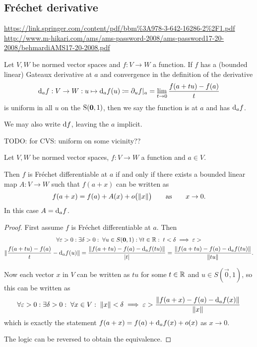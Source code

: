\subsection{Fréchet derivative}
\url{https://link.springer.com/content/pdf/bbm%3A978-3-642-16286-2%2F1.pdf}
\url{http://www.m-hikari.com/ams/ams-password-2008/ams-password17-20-2008/behmardiAMS17-20-2008.pdf}

\begin{definition}
Let $V,W$ be normed vector spaces and $f: V\to W$ a function.
If $f$ has a (bounded linear) Gateaux derivative at $a$ and convergence in the definition of the derivative
\[ \operatorname{d \!}{_af}: V\to W: u\mapsto \operatorname{d \!}{_af}(u) \coloneqq \partial_u f|_a = \lim_{t\to 0} \frac{f(a+tu) - f(a)}{t} \]
is uniform in all $u$ on the $\operatorname{S}(\boldsymbol{\mathrm{0}},1)$, then we say the function is  at $a$ and has  $\operatorname{d \!}{_af}$.

We may also write $\operatorname{d \!}{f}$, leaving the $a$ implicit.
\end{definition}
TODO: for CVS: uniform on some vicinity??

\begin{proposition} \label{FrechetDerivativeAsymptotics}
Let $V,W$ be normed vector spaces, $f:V\to W$ a function and $a\in V$.

Then $f$ is Fréchet differentiable at $a$ \textup{if and only if} there exists a bounded linear map $A: V\to W$ such that $f(a+x)$ can be written as
\[ f(a+x) = f(a) + A(x) + o\big(\lVert x\rVert\big) \qquad \text{as} \qquad x\to 0. \]
In this case $A = \operatorname{d \!}{_af}$.
\end{proposition}
\begin{proof}
First assume $f$ is Fréchet differentiable at $a$. Then
\begin{multline*}
\forall \varepsilon>0:\exists \delta>0: \; \forall u\in S(\boldsymbol{\mathrm{0}},1): \forall t\in\mathbb{R}: \; t< \delta \implies \varepsilon > \\ \lVert\frac{f(a+tu) - f(a)}{t} - \operatorname{d \!}{_af}(u)\rVert = \frac{\lVert f(a+tu) - f(a)- \operatorname{d \!}{_af}(tu)\rVert}{|t|} = \frac{\lVert f(a+tu) - f(a)- \operatorname{d \!}{_af}(tu)\rVert}{\lVert tu\rVert}.
\end{multline*}

Now each vector $x$ in $V$ can be written as $tu$ for some $t\in\mathbb{R}$ and $u\in S(\vec{0},1)$, so this can be written as
\[ \forall \varepsilon>0:\exists \delta>0: \; \forall x\in V: \; \lVert x\rVert< \delta \implies  \varepsilon > \frac{\lVert f(a+x) - f(a)- \operatorname{d \!}{_af}(x)\rVert}{\lVert x\rVert} \]
which is exactly the statement $f(a+x) = f(a) + \operatorname{d \!}{_af}(x) + o(x)$ as $x\to 0$.

The logic can be reversed to obtain the equivalence.
\end{proof}

